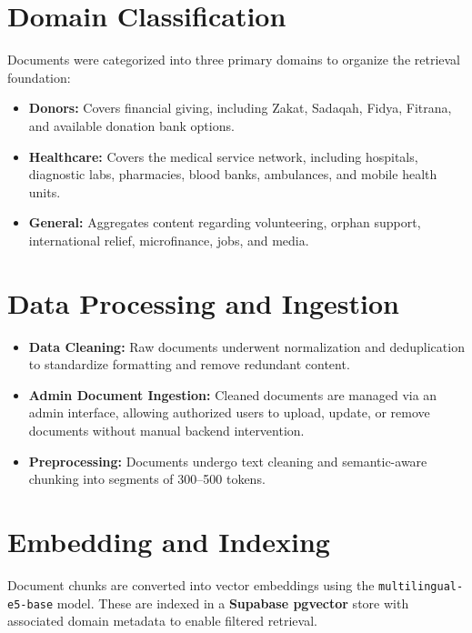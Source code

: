 \section*{Domain Classification}
Documents were categorized into three primary domains to organize the retrieval foundation:
\begin{itemize}\setlength{\itemsep}{0pt}
    \item \textbf{Donors:} Covers financial giving, including Zakat, Sadaqah, Fidya, Fitrana, and available donation bank options.
    \item \textbf{Healthcare:} Covers the medical service network, including hospitals, diagnostic labs, pharmacies, blood banks, ambulances, and mobile health units.
    \item \textbf{General:} Aggregates content regarding volunteering, orphan support, international relief, microfinance, jobs, and media.
\end{itemize}

\section*{Data Processing and Ingestion}
\begin{itemize}\setlength{\itemsep}{0pt}
    \item \textbf{Data Cleaning:} Raw documents underwent normalization and deduplication to standardize formatting and remove redundant content.
    \item \textbf{Admin Document Ingestion:} Cleaned documents are managed via an admin interface, allowing authorized users to upload, update, or remove documents without manual backend intervention.
    \item \textbf{Preprocessing:} Documents undergo text cleaning and semantic-aware chunking into segments of 300--500 tokens.
\end{itemize}

\section*{Embedding and Indexing}
Document chunks are converted into vector embeddings using the \texttt{multilingual-e5-base} model. These are indexed in a \textbf{Supabase pgvector} store with associated domain metadata to enable filtered retrieval.

